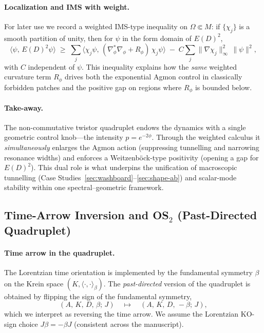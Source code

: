 \documentclass[11pt]{article}
\theoremstyle{definition}
\begin{document}
    \paragraph{Localization and IMS with weight.}
    For later use we record a weighted IMS-type inequality on $\Omega\Subset M$: if $\{\chi_j\}$ is a smooth partition of unity, then for $\psi$ in the form domain of $E(D)^2$,
    \[
    \langle \psi,\,E(D)^2\psi\rangle
    \;\ge\; \sum_j \langle \chi_j\psi,\,(\nabla_\phi^\ast\nabla_\phi + R_\phi)\,\chi_j\psi\rangle \;-\; C\sum_j \|\nabla\chi_j\|_\infty^2\,\|\psi\|^2,
    \]
    with $C$ independent of $\psi$.
    This inequality explains how the \emph{same} weighted curvature term $R_\phi$ drives both the exponential Agmon control in classically forbidden patches and the positive gap on regions where $R_\phi$ is bounded below.
    
    \paragraph{Take-away.}
    The non-commutative twistor quadruplet endows the dynamics with a single geometric control knob---the intensity $p = e^{-2\phi}$.
    Through the weighted calculus it \emph{simultaneously} enlarges the Agmon action (suppressing tunnelling and narrowing resonance widths) and enforces a Weitzenböck-type positivity (opening a gap for $E(D)^2$).
    This dual role is what underpins the unification of macroscopic tunnelling (Case Studies~\ref{sec:washboard}--\ref{sec:shape-ab}) and scalar-mode stability within one spectral--geometric framework.
    
    
    \subsection*{Time-Arrow Inversion and OS$_2$ (Past-Directed Quadruplet)}
    
    \paragraph{Time arrow in the quadruplet.}
    The Lorentzian time orientation is implemented by the fundamental symmetry $\beta$ on the Krein space $(K,\langle\cdot,\cdot\rangle_\beta)$.
    The \emph{past-directed} version of the quadruplet is obtained by flipping the sign of the fundamental symmetry,
    \[
    (A,\,K,\,D,\,\beta;\,J)\quad\longmapsto\quad (A,\,K,\,D,\,-\beta;\,J),
    \]
    which we interpret as reversing the time arrow.
    We assume the Lorentzian KO-sign choice $J\beta=-\beta J$ (consistent across the manuscript).
    
\end{document}
